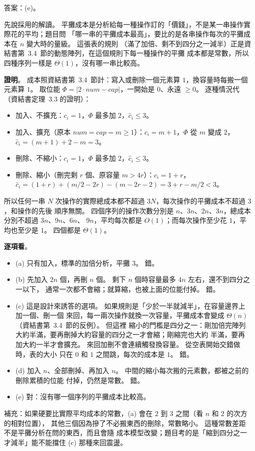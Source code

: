 \begin{pastsoln}
答案：(e)。

先說採用的解讀。 平攤成本是分析給每一種操作訂的「價錢」，不是某一串操作實際花的平均；題目問
「哪一串的平攤成本最高」，要比的是各串操作每次的平攤成本在 $n$ 變大時的量級。 這張表的規則
（滿了加倍、剩不到四分之一減半）正是資結書第~3.4~節的動態陣列，在這個規則下每一種操作的平攤
成本都是常數，所以四種序列一樣是 $\Theta(1)$，沒有哪一串比較高。

\textbf{證明}。 成本照資結書第~3.4~節計：寫入或刪除一個元素算 $1$，換容量時每搬一個元素算 $1$。
取位能 $\Phi = |2 \cdot \mathit{num} - \mathit{cap}|$，一開始是 $0$、永遠 $\ge 0$。 逐種情況代
（資結書定理~3.3 的證明）：
\begin{itemize}
\item 加入、不擴充：$c_i = 1$，$\Phi$ 最多加 $2$，$\hat{c}_i \le 3$。
\item 加入、擴充（原本 $\mathit{num} = \mathit{cap} = m \ge 1$）：$c_i = m + 1$，$\Phi$ 從 $m$ 變成 $2$，
$\hat{c}_i = (m + 1) + 2 - m = 3$。
\item 刪除、不縮小：$c_i = 1$，$\Phi$ 最多加 $2$，$\hat{c}_i \le 3$。
\item 刪除、縮小（刪完剩 $r$ 個、原容量 $m > 4r$）：$c_i = 1 + r$，
$\hat{c}_i = (1 + r) + (m/2 - 2r) - (m - 2r - 2) = 3 + r - m/2 < 3$。
\end{itemize}
所以任何一串 $N$ 次操作的實際總成本都不超過 $3N$，每次操作的平攤成本不超過 $3$，和操作的先後
順序無關。 四個序列的操作次數分別是 $n$、$3n$、$2n$、$3n$，總成本分別不超過 $3n$、$9n$、$6n$、
$9n$，平均每次都是 $O(1)$；而每次操作至少花 $1$，平均也至少是 $1$。 四個都是 $\Theta(1)$。

\textbf{逐項看}。
\begin{itemize}
\item (a) 只有加入，標準的加倍分析，平攤 $3$。 錯。
\item (b) 先加入 $2n$ 個，再刪 $n$ 個。 剩下 $n$ 個時容量最多 $4n$ 左右，還不到四分之一以下，
通常一次都不會縮；就算縮，也被上面的位能付掉。 錯。
\item (c) 這是設計來誘答的選項。 如果規則是「少於一半就減半」，在容量邊界上加一個、刪一個
來回，每一兩次操作就換一次容量，平攤成本會變成 $\Theta(n)$（資結書第~3.4~節的反例）。 但這裡
縮小的門檻是四分之一：剛加倍完陣列大約半滿，要再刪掉大約容量的四分之一才會縮；剛縮完也大約
半滿，要再加大約一半才會擴充。 來回加刪不會連續觸發換容量。 從空表開始交錯做時，表的大小
只在 $0$ 和 $1$ 之間跳，每次的成本是 $1$。 錯。
\item (d) 加入 $n$、全部刪掉、再加入 $n$。 中間的縮小每次搬的元素數，都被之前的刪除累積的位能
付掉，仍然是常數。 錯。
\item (e) 對：沒有哪一個序列的平攤成本比較高。
\end{itemize}

補充：如果硬要比實際平均成本的常數，(a) 會在 $2$ 到 $3$ 之間（看 $n$ 和 $2$ 的次方的相對位置），
其他三個因為摻了不必搬東西的刪除，常數略小。 這種常數差距不是平攤分析在問的東西，而且會隨
成本模型改變；題目考的是「縮到四分之一才減半」能不能擋住 (c) 那種來回震盪。
\end{pastsoln}
